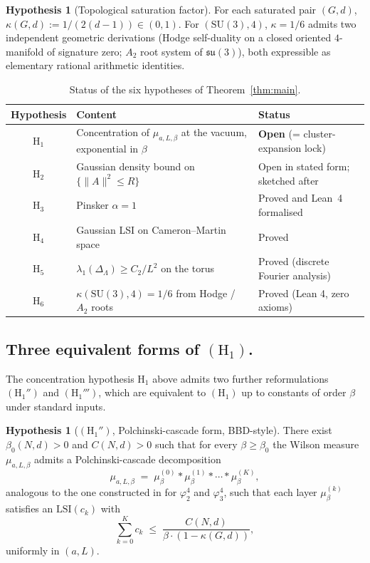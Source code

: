 \documentclass[11pt,reqno]{amsart}
\theoremstyle{plain}
\theoremstyle{definition}
\newtheorem{hypothesis}[theorem]{Hypothesis}
\theoremstyle{remark}
\newcommand{\Lat}{\Lambda}
\begin{document}
\begin{hypothesis}[Topological saturation factor]
\label{hyp:H6}
For each saturated pair $(G, d)$, $\kappa(G, d) := 1/(2(d-1)) \in (0, 1)$. For $(\mathrm{SU}(3), 4)$, $\kappa = 1/6$ admits two independent geometric derivations (Hodge self-duality on a closed oriented $4$-manifold of signature zero; $A_2$ root system of $\mathfrak{su}(3)$), both expressible as elementary rational arithmetic identities.
\end{hypothesis}

\begin{table}[t]
\centering
\begin{tabular}{c|l|l}
Hypothesis & Content & Status\\\hline
$\mathrm{H}_1$ & Concentration of $\mu_{a,L,\beta}$ at the vacuum, exponential in $\beta$ & \textbf{Open} (= cluster-expansion lock)\\
$\mathrm{H}_2$ & Gaussian density bound on $\{\|A\|^2 \le R\}$ & Open in stated form; sketched after \cite{MRS93}\\
$\mathrm{H}_3$ & Pinsker $\alpha = 1$ & Proved \cite{CoverThomas} and Lean~4 formalised\\
$\mathrm{H}_4$ & Gaussian LSI on Cameron--Martin space & Proved \cite{Gross1975}\\
$\mathrm{H}_5$ & $\lambda_1(\Delta_\Lat) \ge C_2/L^2$ on the torus & Proved (discrete Fourier analysis)\\
$\mathrm{H}_6$ & $\kappa(\mathrm{SU}(3), 4) = 1/6$ from Hodge / $A_2$ roots & Proved (Lean 4, zero axioms)\\
\end{tabular}
\medskip
\caption{Status of the six hypotheses of Theorem~\ref{thm:main}.}
\label{tab:hypothesis-status}
\end{table}

\subsection{Three equivalent forms of $(\mathrm{H}_1)$.}
\label{sec:H1-three-forms}

The concentration hypothesis $\mathrm{H}_1$ above admits two further reformulations $(\mathrm{H}_1'')$ and $(\mathrm{H}_1''')$, which are equivalent to $(\mathrm{H}_1)$ up to constants of order $\beta$ under standard inputs.

\begin{hypothesis}[$(\mathrm{H}_1'')$, Polchinski-cascade form, BBD-style]
\label{hyp:H1pp}
There exist $\beta_0(N, d) > 0$ and $C(N, d) > 0$ such that for every $\beta \ge \beta_0$ the Wilson measure $\mu_{a, L, \beta}$ admits a Polchinski-cascade decomposition
\[
  \mu_{a, L, \beta} \;=\; \mu_\beta^{(0)} \ast \mu_\beta^{(1)} \ast \cdots \ast \mu_\beta^{(K)},
\]
analogous to the one constructed in \cite{BD22} for $\varphi^4_2$ and $\varphi^4_3$, such that each layer $\mu_\beta^{(k)}$ satisfies an $\mathrm{LSI}(c_k)$ with
\[
  \sum_{k = 0}^{K} c_k \;\le\; \frac{C(N, d)}{\beta \cdot (1 - \kappa(G, d))},
\]
uniformly in $(a, L)$.
\end{hypothesis}
\end{document}
